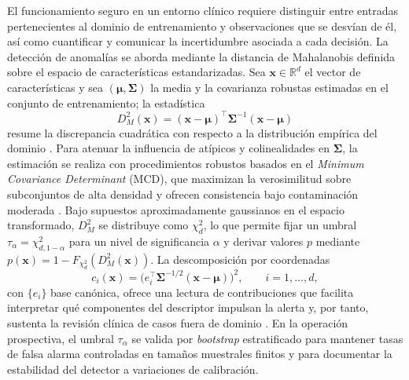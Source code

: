 El funcionamiento seguro en un entorno clínico requiere distinguir entre entradas pertenecientes al dominio de entrenamiento y observaciones que se desvían de él, así como cuantificar y comunicar la incertidumbre asociada a cada decisión. La detección de anomalías se aborda mediante la distancia de Mahalanobis definida sobre el espacio de características estandarizadas. Sea \(\mathbf{x}\in\mathbb{R}^{d}\) el vector de características y sea \((\boldsymbol{\mu},\boldsymbol{\Sigma})\) la media y la covarianza robustas estimadas en el conjunto de entrenamiento; la estadística
\begin{equation}
D_{M}^{2}(\mathbf{x})=(\mathbf{x}-\boldsymbol{\mu})^{\top}\boldsymbol{\Sigma}^{-1}(\mathbf{x}-\boldsymbol{\mu})
\label{eq:mahala}
\end{equation}
resume la discrepancia cuadrática con respecto a la distribución empírica del dominio \cite{Mahalanobis1936}. Para atenuar la influencia de atípicos y colinealidades en \(\boldsymbol{\Sigma}\), la estimación se realiza con procedimientos robustos basados en el \emph{Minimum Covariance Determinant} (MCD), que maximizan la verosimilitud sobre subconjuntos de alta densidad y ofrecen consistencia bajo contaminación moderada \cite{Rousseeuw2019}. Bajo supuestos aproximadamente gaussianos en el espacio transformado, \(D_{M}^{2}\) se distribuye como \(\chi^{2}_{d}\), lo que permite fijar un umbral \(\tau_{\alpha}=\chi^{2}_{d,1-\alpha}\) para un nivel de significancia \(\alpha\) y derivar valores \(p\) mediante \(p(\mathbf{x})=1-F_{\chi^{2}_{d}}(D_{M}^{2}(\mathbf{x}))\). La descomposición por coordenadas
\begin{equation}
c_{i}(\mathbf{x})=\bigl(e_{i}^{\top}\boldsymbol{\Sigma}^{-1/2}(\mathbf{x}-\boldsymbol{\mu})\bigr)^{2},\qquad i=1,\dots,d,
\end{equation}
con \(\{e_{i}\}\) base canónica, ofrece una lectura de contribuciones que facilita interpretar qué componentes del descriptor impulsan la alerta y, por tanto, sustenta la revisión clínica de casos fuera de dominio \cite{Rousseeuw2019}. En la operación prospectiva, el umbral \(\tau_{\alpha}\) se valida por \emph{bootstrap} estratificado para mantener tasas de falsa alarma controladas en tamaños muestrales finitos y para documentar la estabilidad del detector a variaciones de calibración.

